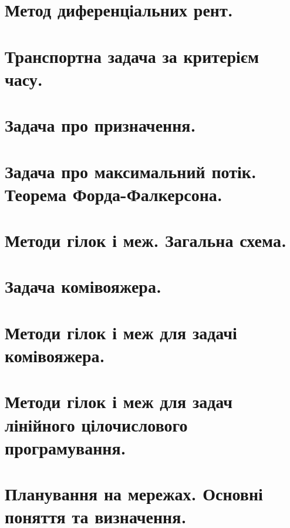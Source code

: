 \documentclass[12pt,a4paper]{article}
\begin{document}
\clearpage

\section{Метод диференціальних рент.}

\clearpage

\section{Транспортна задача за критерієм часу.}

\clearpage

\section{Задача про призначення.}

\clearpage

\section{Задача про максимальний потік. Теорема Форда-Фалкерсона.}

\clearpage

\section{Методи гілок і меж. Загальна схема.}

\clearpage

\section{Задача комівояжера.}

\clearpage

\section{Методи гілок і меж для задачі комівояжера.}

\clearpage

\section{Методи гілок і меж для задач лінійного цілочислового програмування.}

\clearpage


\section{Планування на мережах. Основні поняття та визначення.}
\end{document}
